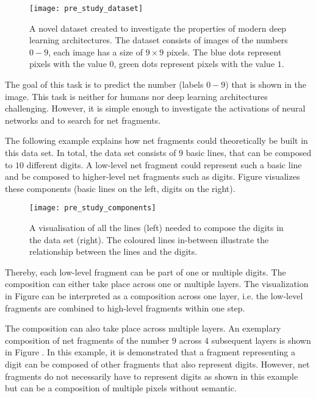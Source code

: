 \begin{figure}[h]
    \centering
    \texttt{[image: pre\_study\_dataset]}
    \caption[Straight Line Digits Dataset]{A novel dataset created to investigate the properties of modern deep learning architectures. The dataset consists of images of the numbers $0-9$, each image has a size of $9\times9$ pixels. The blue dots represent pixels with the value $0$, green dots represent pixels with the value $1$.}
\end{figure}

The goal of this task is to predict the number (labels $0-9$) that is shown in the image.
This task is neither for humans nor deep learning architectures challenging.
However, it is simple enough to investigate the activations of neural networks and to search for net fragments.

The following example explains how net fragments could theoretically be built in this data set.
In total, the data set consists of $9$ basic lines, that can be composed to $10$ different digits.
A low-level net fragment could represent such a basic line and be composed to higher-level net fragments such as digits.
Figure  visualizes these components (basic lines on the left, digits on the right).

\begin{figure}[h]
    \centering
    \texttt{[image: pre\_study\_components]}
    \caption[Line Types in Straight Line Digits Dataset]{A visualisation of all the lines (left) needed to compose the digits in the data set (right). The coloured lines in-between illustrate the relationship between the lines and the digits.}
\end{figure}

Thereby, each low-level fragment can be part of one or multiple digits.
The composition can either take place across one or multiple layers.
The visualization in Figure  can be interpreted as a composition across one layer, i.e. the low-level fragments are combined to high-level fragments within one step.

The composition can also take place across multiple layers. 
An exemplary composition of net fragments of the number $9$ across $4$ subsequent layers is shown in Figure .
In this example, it is demonstrated that a fragment representing a digit can be composed of other fragments that also represent digits.
However, net fragments do not necessarily have to represent digits as shown in this example but can be a composition of multiple pixels without semantic.

